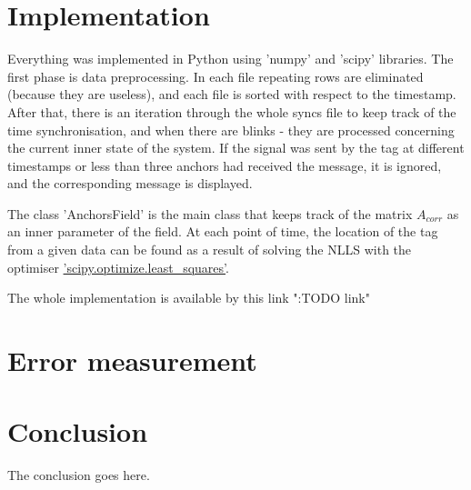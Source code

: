 \documentclass[journal]{IEEEtran}
\begin{document}
\section{Implementation}


Everything was implemented in Python using 'numpy' and 'scipy' libraries.
The first phase is data preprocessing. 
In each file repeating rows are eliminated (because they are useless), and each file is sorted with respect to the timestamp.
After that, there is an iteration through the whole syncs file to keep track of the time synchronisation, and when there are blinks - they are processed concerning the current inner state of the system.
If the signal was sent by the tag at different timestamps or less than three anchors had received the message, it is ignored, and the corresponding message is displayed.

The class 'AnchorsField' is the main class that keeps track of the matrix $A_{corr}$ as an inner parameter of the field.
At each point of time, the location of the tag from a given data can be found as a result of solving the NLLS with the optimiser \href{https://docs.scipy.org/doc/scipy/reference/generated/scipy.optimize.least_squares.html#scipy.optimize.least_squares}{'scipy.optimize.least\_squares'}.



The whole implementation is available by this link ":TODO link"
\section{Error measurement}
\label{sec:error}

\section{Conclusion}
The conclusion goes here.

{}

\cleardoublepage
\end{document}
